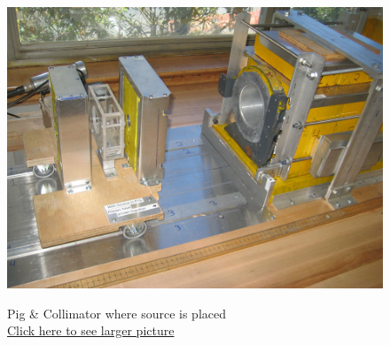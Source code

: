 \documentclass{../lab}
\begin{document}
\begin{figure}[H]
  \href{http://experimentationlab.berkeley.edu/sites/default/files/images/GMA_Layout_3537-Lg.jpg}{\includegraphics[width=\linewidth,keepaspectratio]{images/GMA_Layout_3537-Lg.jpg}}
  \caption{Pig \& Collimator where source is placed \\ \href{http://experimentationlab.berkeley.edu/sites/default/files/images/GMA_Layout_3537-Lg.jpg}{Click here to see larger picture}}\label{fig:PigCollimator}
\endminipage
\end{figure}
\end{document}
